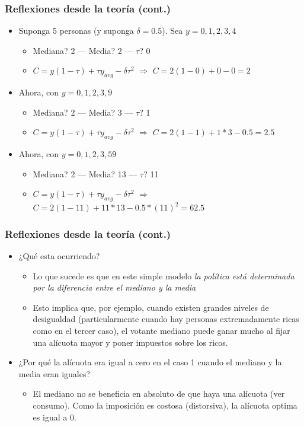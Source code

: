 \documentclass[14pt,aspectratio=169]{beamer}
\begin{document}
\begin{frame}\frametitle{Reflexiones desde la teoría (cont.)}
\begin{itemize}
\item Suponga 5 personas (y suponga $\delta=0.5$). Sea $y={0,1,2,3,4}$
\begin{itemize}\itemsep 0pt \medskip
\item Mediana? 2 ---  Media? 2 --- $\tau$? 0
\item $C=y(1-\tau)+\tau y_{avg}-\delta \tau^2$ $\Rightarrow$ $C=2(1-0)+0-0=2$
\end{itemize}
\item Ahora, con $y={0,1,2,3,9}$
\begin{itemize}\itemsep 0pt \medskip
\item Mediana? 2 --- Media? 3 --- $\tau$? 1
\item $C=y(1-\tau)+\tau y_{avg}-\delta \tau^2$ $\Rightarrow$ $C=2(1-1)+1*3-0.5=2.5$
\end{itemize}
\item Ahora, con $y={0,1,2,3,59}$
\begin{itemize}\itemsep 0pt \medskip
\item Mediana? 2 --- Media? 13 --- $\tau$? 11
\item $C=y(1-\tau)+\tau y_{avg}-\delta \tau^2$ $\Rightarrow$ $C=2(1-11)+11*13-0.5*(11)^2=62.5$
\end{itemize}
\end{itemize}
\end{frame}


\begin{frame}\frametitle{Reflexiones desde la teoría (cont.)}
\begin{itemize}
\item ¿Qué esta ocurriendo? 
\begin{itemize}
\item Lo que sucede es que en este simple modelo \textit{la política está determinada por la
  diferencia entre el mediano y la media}
\item Esto implica que, por ejemplo, cuando existen grandes niveles de
  desigualdad (particularmente cuando hay personas extremadamente
  ricas como en el tercer caso), el votante mediano puede ganar mucho
  al fijar una alícuota mayor y poner impuestos sobre los ricos. 
\end{itemize}
\item ¿Por qué la alícuota era igual a cero en el caso 1 cuando el
  mediano y la media eran iguales?
\begin{itemize}\itemsep 5pt \medskip
\item El mediano no se beneficia en absoluto de que haya una alícuota
  (ver consumo). Como la imposición es costosa (distorsiva), la
  alícuota optima es igual a 0. 
\end{itemize}
\end{itemize}
\end{frame}
\end{document}
